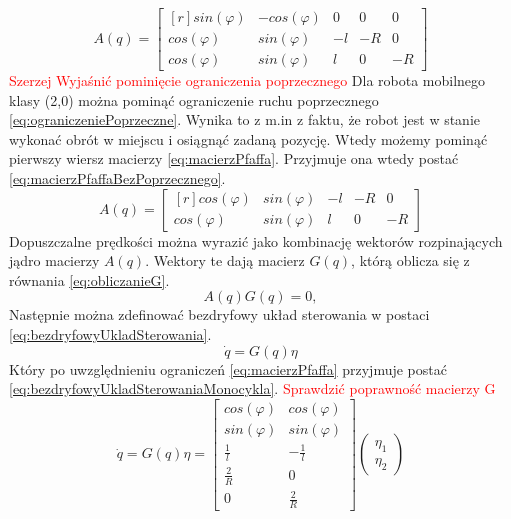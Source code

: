         \begin{equation}
            A(q) =
            \begin{bmatrix*}[r]
            sin(\varphi) & -cos(\varphi) & 0  &  0 & 0 \\
            cos(\varphi) & sin(\varphi)  & -l & -R & 0 \\
            cos(\varphi) & sin(\varphi)  & l  &  0 & -R 
            \end{bmatrix*}
            \label{eq:macierzPfaffa}
        \end{equation}
        \textcolor{red}{Szerzej Wyjaśnić pominięcie ograniczenia poprzecznego}
        Dla robota mobilnego klasy (2,0) można pominąć ograniczenie ruchu poprzecznego \ref{eq:ograniczeniePoprzeczne}. Wynika to z m.in z faktu, że robot jest w stanie wykonać obrót w miejscu i osiągnąć zadaną pozycję. Wtedy możemy pominąć pierwszy wiersz macierzy \ref{eq:macierzPfaffa}. Przyjmuje ona wtedy postać \ref{eq:macierzPfaffaBezPoprzecznego}.
        \begin{equation}
            A(q) =
            \begin{bmatrix*}[r]
            cos(\varphi) & sin(\varphi)  & -l & -R & 0 \\
            cos(\varphi) & sin(\varphi)  & l  &  0 & -R 
            \end{bmatrix*}
            \label{eq:macierzPfaffaBezPoprzecznego}
        \end{equation}
        Dopuszczalne prędkości można wyrazić jako kombinację wektorów rozpinających jądro macierzy $A(q)$. Wektory te dają macierz $G(q)$, którą oblicza się z równania \ref{eq:obliczanieG}.
        \begin{equation}
            A(q)G(q)=0,
            \label{eq:obliczanieG}
        \end{equation}
        Następnie można zdefinować bezdryfowy układ sterowania w postaci \ref{eq:bezdryfowyUkladSterowania}.
        \begin{equation}
            \dot{q} = G(q)\eta
            \label{eq:bezdryfowyUkladSterowania}
        \end{equation}
        Który po uwzględnieniu ograniczeń \ref{eq:macierzPfaffa} przyjmuje postać \ref{eq:bezdryfowyUkladSterowaniaMonocykla}. \textcolor{red}{Sprawdzić poprawność macierzy G}
        \begin{equation}
            \dot{q} = G(q)\eta =
            \begin{bmatrix*}
                cos(\varphi) & cos(\varphi) \\
                sin(\varphi) & sin(\varphi) \\
                \frac{1}{l} & -\frac{1}{l} \\
                \frac{2}{R} & 0 \\
                0 & \frac{2}{R} 
            \end{bmatrix*}
            \left(\begin{array}{c}
                \eta_1 \\
                \eta_2
            \end{array}\right)
            \label{eq:bezdryfowyUkladSterowaniaMonocykla}
        \end{equation}
